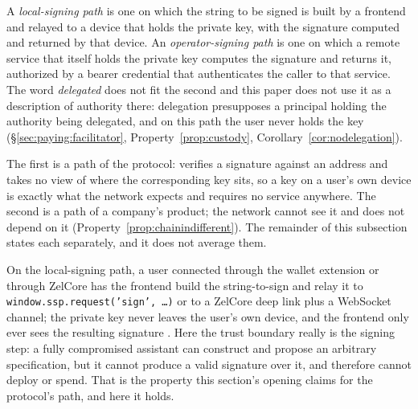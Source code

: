 \begin{definition}
\label{def:nl:paths}
A \emph{local-signing path} is one on which the string to be signed is built by a
frontend and relayed to a device that holds the private key, with the signature
computed and returned by that device. An \emph{operator-signing path} is one on which a
remote service that itself holds the private key computes the signature and returns it,
authorized by a bearer credential that authenticates the caller to that service. The word
\emph{delegated} does not fit the second and this paper does not use it as a description
of authority there: delegation presupposes a principal holding the authority being
delegated, and on this path the user never holds the key
(\S\ref{sec:paying:facilitator}, Property~\ref{prop:custody},
Corollary~\ref{cor:nodelegation}).
\end{definition}

The first is a path of the protocol: \Flux verifies a signature against an address and
takes no view of where the corresponding key sits, so a key on a user's own device is
exactly what the network expects and requires no service anywhere. The second is a path
of a company's product; the network cannot see it and does not depend on it
(Property~\ref{prop:chainindifferent}). The remainder of this subsection states each
separately, and it does not average them.

On the local-signing path, a user connected through the \SSP wallet extension or through
ZelCore has the frontend build the string-to-sign and relay it to \texttt{window.ssp.request('sign', \ldots)}
or to a ZelCore deep link plus a WebSocket channel; the private key never leaves the
user's own device, and the frontend only ever sees the resulting signature \shipped
{}.
Here the trust boundary really is the signing step: a fully compromised assistant can
construct and propose an arbitrary specification, but it cannot produce a valid signature
over it, and therefore cannot deploy or spend. That is the property this section's opening
claims for the protocol's path, and here it holds.

